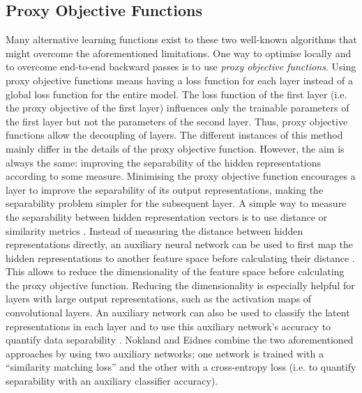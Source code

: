 \subsection{Proxy Objective Functions}
Many alternative learning functions exist to these two well-known algorithms that might overcome the aforementioned limitations.
One way to optimise locally and to overcome end-to-end backward passes is to use \emph{proxy objective functions}.
Using proxy objective functions means having a loss function for each layer instead of a global loss function for the entire model.
The loss function of the first layer (i.e. the proxy objective of the first layer) influences only the trainable parameters of the first layer but not the parameters of the second layer.
Thus, proxy objective functions allow the decoupling of layers.
The different instances of this method mainly differ in the details of the proxy objective function.
However, the aim is always the same: improving the separability of the hidden representations according to some measure.
Minimising the proxy objective function encourages a layer to improve the separability of its output representations, making the separability problem simpler for the subsequent layer.
A simple way to measure the separability between hidden representation vectors is to use distance or similarity metrics .
Instead of measuring the distance between hidden representations directly, an auxiliary neural network can be used to first map the hidden representations to another feature space before calculating their distance .
This allows to reduce the dimensionality of the feature space before calculating the proxy objective function.
Reducing the dimensionality is especially helpful for layers with large output representations, such as the activation maps of convolutional layers.
An auxiliary network can also be used to classify the latent representations in each layer and to use this auxiliary network's accuracy to quantify data separability .
Nokland and Eidnes  combine the two aforementioned approaches by using two auxiliary networks; one network is trained with a ``similarity matching loss'' and the other with a cross-entropy loss (i.e. to quantify separability with an auxiliary classifier accuracy).

